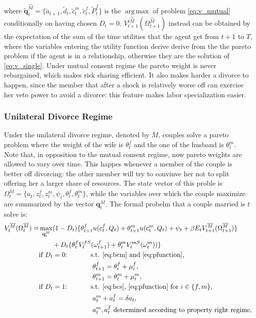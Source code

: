 \documentclass[12pt]{article}
\numberwithin{table}{section}
\DeclareMathOperator*{\argmax}{arg\,max}
\begin{document}
where $\mathbf{\tilde{q}}^{\hat{M}}_t=\{\tilde{a}_{t+1},\tilde{d}_{t},\tilde{c}^{m}_{t},\tilde{c}^{f}_{t},\tilde{P}^{f}_t\}$ is the $\argmax$ of problem \eqref{eq:v_mutual} conditionally on having chosen $D_t=0$. $V_{t+1}^{i\hat{M}}(\Omega^{\hat{M}}_{t+1})$ instead can be obtained by the expectation of the sum of the time utilities that the agent get from $t+1$ to $T$, where the variables entering the utility function derive derive from the the pareto problem if the agent is in a relationship, otherwise they are the solution of \eqref{eq:v_single}. Under mutual consent regime the pareto weight is never rebargained, which makes risk sharing efficient. It also makes harder a divorce to happen, since the member that after a shock is relatively worse off can exercise her veto power to avoid a divorce: this feature makes labor specialization easier.
\subsubsection*{Unilateral Divorce Regime}
Under the unilateral divorce regime, denoted by $\overline{M}$, couples solve a pareto problem where the weight of the wife is $\theta^f_t$ and the one of the husband is $\theta^m_t$. Note that, in opposition to the mutual consent regime, now pareto weights are allowed to vary over time. This happes whenever a member of the couple is better off divorcing: the other member will try to convinve her not to split offering her a larger share of resources. The state vector of this proble is $\Omega^{\overline{M}}_t=\{a_t,z^f_t,z^m_t,\psi_t,\theta^f_t,\theta^m_t\}$, while the variables over which the couple maximize are summarized by the vector $\mathbf{q}^M_t$. The formal probelm that a couple married is $t$ solve is:
\begin{equation}\label{eq:v_uni}
\begin{split}
V_t^{\overline{M}}(\Omega^{\overline{M}}_t)=&\max_{\mathbf{q}^M_t} (1-D_t)\{\theta^f_{t+1} u(c^f_t,Q_t)+\theta^m_{t+1} u(c^m_t,Q_t)+\psi_t+\beta E_t V^{\overline{M}}_{t+1}(\Omega^{\overline{M}}_{t+1})\}\\ &\quad\quad+D_t \{\theta^f_{t}V^{fS}_{t}(\omega^{f}_{t+1})+\theta^m_{t} V^{mS}_{t}(\omega^{m}_{t}))\}
\\ &\text{if $D_t=0$:}\hspace{35pt}\text{s.t. \eqref{eq:bcm} and \eqref{eq:pfunction},}\\ &\hspace{80pt}
\theta^f_{t+1}=\theta^f_{t}+\mu^f_t,\\ &\hspace{80pt}
\theta^m_{t+1}=\theta^m_{t}+\mu^m_t,
\\ &\text{if $D_t=1$:}\hspace{35pt}\text{s.t. \eqref{eq:bcs}, \eqref{eq:pfunction} for $i\in\{f,m\}$,}\\ &
\hspace{80pt}a_t^m+a_t^f=\delta a_t,	\\ &
\hspace{80pt}a_t^m,a_t^f\text{ determined according to property right regime},
\end{split}
\end{equation}
\end{document}
